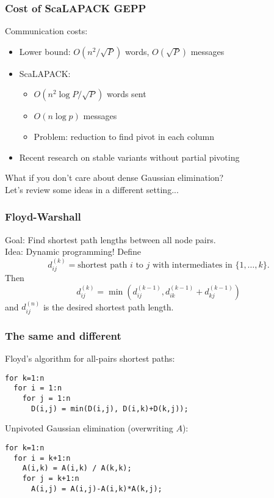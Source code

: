 \documentclass{beamer}
\begin{document}
\begin{frame}
  \frametitle{Cost of ScaLAPACK GEPP}
  
  Communication costs:
  \begin{itemize}
  \item Lower bound: $O(n^2/\sqrt{P})$ words, $O(\sqrt{P})$ messages
  \item ScaLAPACK: 
    \begin{itemize}
    \item $O(n^2 \log P / \sqrt{P})$ words sent
    \item {\color{red} $O(n \log p)$} messages
    \item Problem: reduction to find pivot in each column
    \end{itemize}
  \item Recent research on stable variants without partial pivoting
  \end{itemize}
\end{frame}


\begin{frame}
  \begin{center}
  What if you don't care about dense Gaussian elimination? \\
  Let's review some ideas in a different setting...
  \end{center}
\end{frame}


\begin{frame}
  \frametitle{Floyd-Warshall}
  
  Goal: Find shortest path lengths between all node pairs. \\[5mm]
  Idea: Dynamic programming!  Define
  \[
    d_{ij}^{(k)} =
    \mbox{shortest path $i$ to $j$ with intermediates in $\{1, \ldots, k\}$}.
  \]
  Then
  \[
    d_{ij}^{(k)} = 
    \min\left( d_{ij}^{(k-1)}, d_{ik}^{(k-1)} + d_{kj}^{(k-1)} \right)
  \]
  and $d_{ij}^{(n)}$ is the desired shortest path length.
\end{frame}


\begin{frame}[fragile]
  \frametitle{The same and different}

Floyd's algorithm for all-pairs shortest paths:
\begin{lstlisting}
for k=1:n
  for i = 1:n
    for j = 1:n
      D(i,j) = min(D(i,j), D(i,k)+D(k,j));
\end{lstlisting}

\vspace{5mm}
Unpivoted Gaussian elimination (overwriting $A$):
\begin{lstlisting}
for k=1:n
  for i = k+1:n
    A(i,k) = A(i,k) / A(k,k);
    for j = k+1:n
      A(i,j) = A(i,j)-A(i,k)*A(k,j);
\end{lstlisting}

\end{frame}
\end{document}
